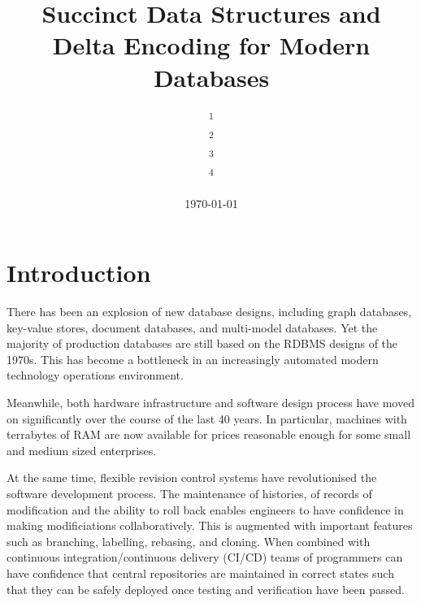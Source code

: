 \documentclass[10pt, a4paper, twocolumn]{article} %
\title{Succinct Data Structures and Delta Encoding for Modern Databases}
\author{
  \authorstyle{Matthijs van Otterdijk\textsuperscript{1,2} and Gavin Mendel-Gleason\textsuperscript{1,3} and Kevin Feeney\textsuperscript{1,4}}
  \newline\newline
  \textsuperscript{1}\institution{TerminusDB {\protect\url{http://terminusdb.com}}}\\
  \textsuperscript{2}\institution{\protect\url{matthijs@datachemist.com}}\\
  \textsuperscript{3}\institution{\protect\url{gavin@datachemist.com}}\\
  \textsuperscript{4}\institution{\protect\url{kevin@datachemist.com}}
}
\date{\today}
\begin{document}
\maketitle

\thispagestyle{firstpage}


\section{Introduction}

There has been an explosion of new database designs, including graph
databases, key-value stores, document databases, and multi-model
databases. Yet the majority of production databases are still based on
the RDBMS designs of the 1970s\autocite{Codd:1970:RMD:362384.362685}. This
has become a bottleneck in an increasingly automated modern technology
operations environment.

Meanwhile, both hardware infrastructure and software design process
have moved on significantly over the course of the last 40 years. In
particular, machines with terrabytes of RAM are now available for
prices reasonable enough for some small and medium sized enterprises.

At the same time, flexible revision control systems have
revolutionised the software development process. The maintenance of
histories, of records of modification and the ability to roll back
enables engineers to have confidence in making modificiations
collaboratively. This is augmented with important features such as
branching, labelling, rebasing, and cloning. When combined with
continuous integration/continuous
delivery\autocite{65147}\autocite{LAUKKANEN201755} (CI/CD) teams of
programmers can have confidence that central repositories are
maintained in correct states such that they can be safely deployed
once testing and verification have been passed.
\end{document}
